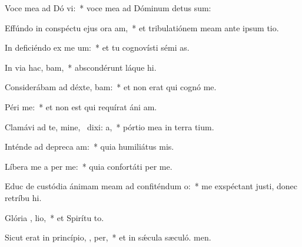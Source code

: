 \item Voce mea ad Dó vi:~* voce mea ad Dóminum detus sum:
\item Effúndo in conspéctu ejus ora am,~* et tribulatiónem meam ante ipsum tio.
\item In deficiéndo ex me  um:~* et tu cognovísti sémi as.
\item In via hac,  bam,~* abscondérunt láque hi.
\item Considerábam ad déxte,  bam:~* et non erat qui cognó me.
\item Péri   me:~* et non est qui requírat áni am.
\item Clamávi ad te, mine,~\pscross{} dixi:    a,~* pórtio mea in terra tium.
\item Inténde ad depreca am:~* quia humiliátus  mis.
\item Líbera me a per me:~* quia confortáti  per me.
\item Educ de custódia ánimam meam ad confiténdum  o:~* me exspéctant justi, donec retríbu hi.
\item Glória ,  lio,~* et Spirítu to.
\item Sicut erat in princípio,  ,  per,~* et in sǽcula sæculó. men.
